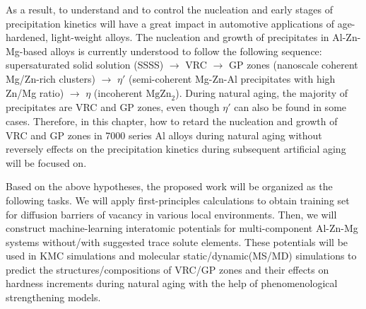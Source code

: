 As a result, to understand and to control the nucleation and early stages of precipitation kinetics will have a great impact in automotive applications of age-hardened, light-weight alloys. \cite{deschamps1998influence,banhart2011kinetics,liang2012kinetics,deschamps2014precipitation} The nucleation and growth of precipitates in Al-Zn-Mg-based alloys is currently understood to follow the following sequence: supersaturated solid solution (SSSS) $\rightarrow$ \acf{VRC} $\rightarrow$ \acf{GP} zones (nanoscale coherent Mg/Zn-rich clusters) $\rightarrow$ $\eta'$ (semi-coherent Mg-Zn-Al precipitates with high Zn/Mg ratio) $\rightarrow$ $\eta$ (incoherent $\text{MgZn}_\text{2}$). \cite{ragueneau2000review,deschamps2014precipitation,berg2001gp,chung2018transmission} During natural aging, the majority of precipitates are \ac{VRC} and \ac{GP} zones, even though $\eta'$ can also be found in some cases. \cite{mukhopadhyay1994guinier} Therefore, in this chapter, how to retard the nucleation and growth of \ac{VRC} and \ac{GP} zones in 7000 series Al alloys during natural aging without reversely effects on the precipitation kinetics during subsequent artificial aging will be focused on.

Based on the above hypotheses, the proposed work will be organized as the following tasks. We will apply first-principles calculations to obtain training set for diffusion barriers of vacancy in various local environments. Then, we will construct machine-learning interatomic potentials for multi-component Al-Zn-Mg systems without/with suggested trace solute elements. These potentials will be used in \ac{KMC} simulations and molecular static/dynamic(MS/MD) simulations to predict the structures/compositions of \ac{VRC}/\ac{GP} zones and their effects on hardness increments during natural aging with the help of phenomenological strengthening models.